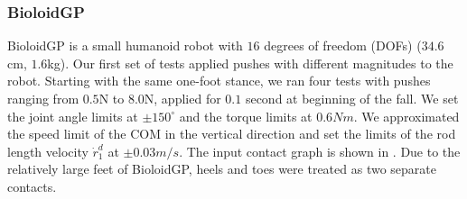 \subsubsection{BioloidGP}
BioloidGP is a small humanoid robot with $16$ degrees of freedom (DOFs)
($34.6$cm, $1.6$kg). Our first set of tests applied pushes with
different magnitudes to the robot. Starting with the same one-foot
stance, we ran four tests with pushes ranging from $0.5$N to $8.0$N,
applied for $0.1$ second at beginning of the fall. We set the joint
angle limits at $\pm150^{\circ}$ and the torque limits at $0.6Nm$. We
approximated the speed limit of the COM in the vertical direction and
set the limits of the rod length velocity $\dot{r}_1^d$ at
$\pm0.03m/s$. The input contact graph is shown in
.  Due to the relatively large feet of
BioloidGP, heels and toes were treated as two separate contacts.


